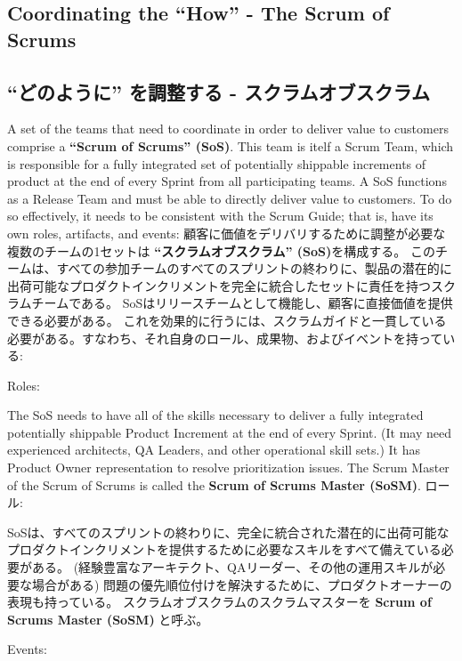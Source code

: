\documentclass[12pt,a4paper,parskip=full]{scrartcl}
\begin{document}
\subsection{Coordinating the ``How'' - The Scrum of Scrums}
\fi
\subsection{``どのように'' を調整する - スクラムオブスクラム}
A set of the teams that need to coordinate in order to deliver value to customers comprise a \textbf{``Scrum of Scrums'' (SoS)}. This team is itelf a Scrum Team, which is responsible for a fully integrated set of potentially shippable increments of product at the end of every Sprint from all participating teams. A SoS functions as a Release Team and must be able to directly deliver value to customers. To do so effectively, it needs to be consistent with the Scrum Guide; that is, have its own roles, artifacts, and events:
\fi
顧客に価値をデリバリするために調整が必要な複数のチームの1セットは \textbf{``スクラムオブスクラム'' (SoS)}を構成する。
このチームは、すべての参加チームのすべてのスプリントの終わりに、製品の潜在的に出荷可能なプロダクトインクリメントを完全に統合したセットに責任を持つスクラムチームである。
SoSはリリースチームとして機能し、顧客に直接価値を提供できる必要がある。
これを効果的に行うには、スクラムガイドと一貫している必要がある。すなわち、それ自身のロール、成果物、およびイベントを持っている:

Roles:

The SoS needs to have all of the skills necessary to deliver a fully integrated potentially shippable Product Increment at the end of every Sprint. (It may need experienced architects, QA Leaders, and other operational skill sets.) It has Product Owner representation to resolve prioritization issues.
The Scrum Master of the Scrum of Scrums is called the \textbf{Scrum of Scrums Master (SoSM)}.
\fi
ロール:

SoSは、すべてのスプリントの終わりに、完全に統合された潜在的に出荷可能なプロダクトインクリメントを提供するために必要なスキルをすべて備えている必要がある。
(経験豊富なアーキテクト、QAリーダー、その他の運用スキルが必要な場合がある)
問題の優先順位付けを解決するために、プロダクトオーナーの表現も持っている。
スクラムオブスクラムのスクラムマスターを \textbf{Scrum of Scrums Master (SoSM)} と呼ぶ。

Events:
\end{document}
